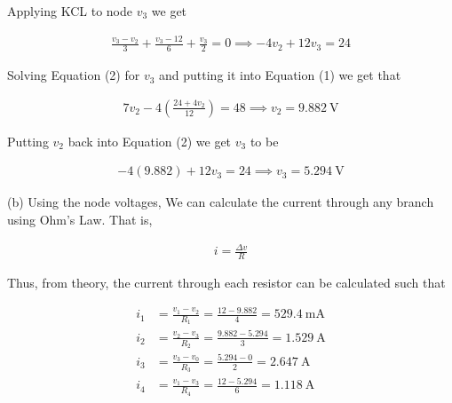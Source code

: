 \documentclass[12pt]{article}
\begin{document}
Applying KCL to node $v_3$ we get

\begin{equation}
    \begin{split}
         \frac{v_3 - v_2}{3} + \frac{v_3 - 12}{6} + \frac{v_3}{2} = 0 \implies -4v_2 + 12v_3 = 24
    \end{split}
\end{equation}

Solving Equation (2) for $v_3$ and putting it into Equation (1) we get that

\begin{equation}
    \begin{split}
         7v_2 - 4\left(\frac{24+4v_2}{12}\right) = 48 \implies v_2 = \SI{9.882}{\volt}
    \end{split}
\end{equation}

Putting $v_2$ back into Equation (2) we get $v_3$ to be

\begin{equation}
    \begin{split}
        -4(9.882) + 12v_3 = 24 \implies v_3 = \SI{5.294}{\volt}
    \end{split}
\end{equation}

(b) Using the node voltages, We can calculate the current through any branch using Ohm's Law. That is,

\begin{equation*}
    \begin{split}
        i = \frac{\Delta v}{R}
    \end{split}
\end{equation*}

Thus, from theory, the current through each resistor can be calculated such that

\begin{equation}
    \begin{split}
        i_1 &= \frac{v_1 - v_2}{R_1} = \frac{12 - 9.882}{4} = \SI{529.4}{\milli\ampere} \\
        i_2 &= \frac{v_2 - v_3}{R_2} = \frac{9.882 - 5.294}{3} = \SI{1.529}{\ampere} \\
        i_3 &= \frac{v_3 - v_0}{R_3} = \frac{5.294 - 0}{2} = \SI{2.647}{\ampere} \\
        i_4 &= \frac{v_1 - v_3}{R_4} = \frac{12 - 5.294}{6} = \SI{1.118}{\ampere}
    \end{split}
\end{equation}
\end{document}
